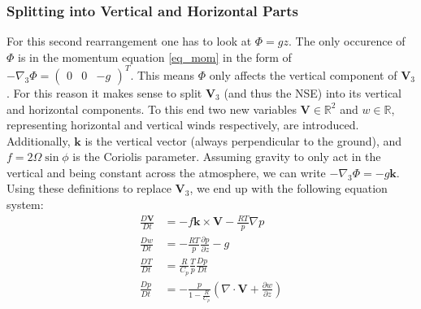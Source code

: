 \subsubsection{Splitting into Vertical and Horizontal Parts}
For this second rearrangement one has to look at $\Phi = gz$.
The only occurence of $\Phi$ is in the momentum equation \ref{eq_mom} in the form of $-\nabla _3 \Phi=\begin{pmatrix}0 & 0 & -g \end{pmatrix}^T $.
This means $\Phi$ only affects the vertical component of $\textbf{V}_3$.
For this reason it makes sense to split $\textbf{V}_3$ (and thus the NSE) into its vertical and horizontal components.
To this end two new variables $\textbf{V} \in \mathbb{R}^2$ and $w\in \mathbb{R}$, representing horizontal and vertical winds respectively, are introduced.
Additionally, $\boldsymbol{k}$ is the vertical vector (always perpendicular to the ground), and $f=2\Omega \sin \phi$ is the Coriolis parameter.
Assuming gravity to only act in the vertical and being constant across the atmosphere, we can write $-\nabla_3 \Phi = -g \boldsymbol{k}$.
Using these definitions to replace $\textbf{V}_3$, we end up with the following equation system:
\begin{align*}
\frac{D\textbf{V}}{Dt} &= -f\boldsymbol{k} \times \textbf{V} - \frac{RT}{p}\nabla p\\
\frac{Dw}{Dt} &= - \frac{RT}{p} \frac{\partial p}{\partial z} - g \\
\frac{DT}{Dt} &= \frac{R}{C_p}\frac{T}{p}\frac{Dp}{Dt}\\
\frac{Dp}{Dt} &= -\frac{p}{1- \frac{R}{C_p}} (\nabla \cdot \textbf{V} + \frac{\partial w}{\partial z})
\end{align*}

